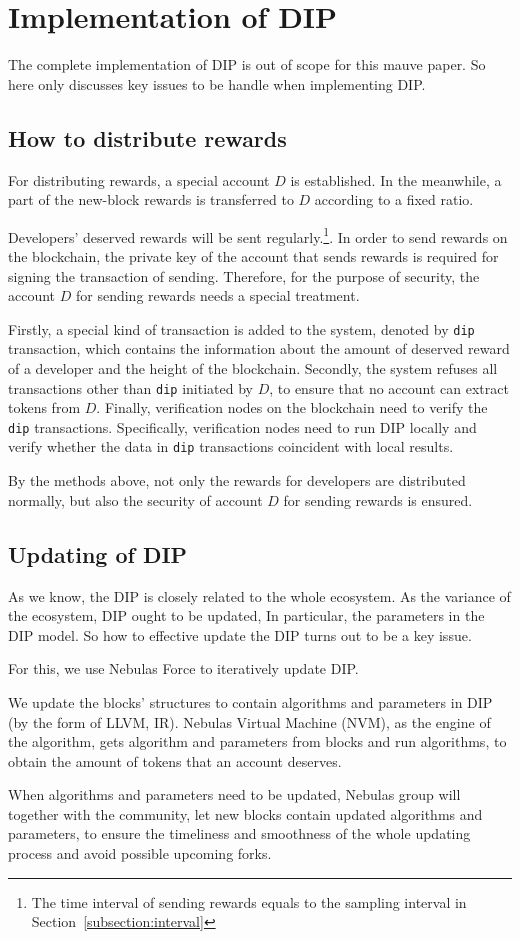 \section{Implementation of DIP}
\noindent
The complete implementation of DIP is out of scope for this mauve paper. So here only discusses key issues to be handle when implementing DIP\@.

\subsection{How to distribute rewards}
\noindent
For distributing rewards, a special account $D$ is established. In the meanwhile, a part of the new-block rewards is transferred to $D$ according to a fixed ratio.

Developers' deserved rewards will be sent regularly.\footnote{The time interval of sending rewards equals to the sampling interval in Section~\ref{subsection:interval}}. In order to send rewards on the blockchain, the private key of the account that sends rewards is required for signing the transaction of sending. Therefore, for the purpose of security, the account $D$ for sending rewards needs a special treatment.

Firstly, a special kind of transaction is added to the system, denoted by \texttt{dip} transaction, which contains the information about the amount of deserved reward of a developer and the height of the blockchain. Secondly, the system refuses all transactions other than \texttt{dip} initiated by $D$, to ensure that no account can extract tokens from $D$. Finally, verification nodes on the blockchain  need to verify the \texttt{dip} transactions. Specifically, verification nodes need to run DIP locally and verify whether the data in \texttt{dip} transactions coincident with local results.

By the methods above, not only the rewards for developers are distributed normally, but also the security of account $D$ for sending rewards is ensured.

\subsection{Updating of DIP}
\noindent
As we know, the DIP is closely related to the whole ecosystem. As the variance of the ecosystem, DIP ought to be updated, In particular, the parameters in the DIP model. So how to effective update the DIP turns out to be a key issue.

For this, we use Nebulas Force to iteratively update DIP\@.

We update the blocks' structures to contain algorithms and parameters in DIP (by the form of LLVM, IR). Nebulas Virtual Machine (NVM), as the engine of the algorithm, gets algorithm and parameters from blocks and run algorithms, to obtain the amount of tokens that an account deserves.

When algorithms and parameters need to be updated, Nebulas group will together with the community, let new blocks contain updated algorithms and parameters, to ensure the timeliness and smoothness of the whole updating process and avoid possible upcoming forks.
